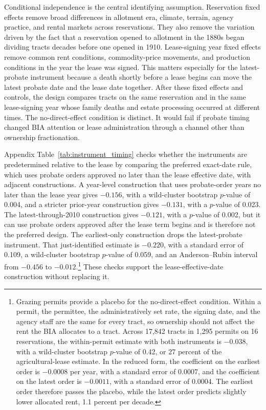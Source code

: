 \documentclass[12pt]{article}
\begin{document}
Conditional independence is the central identifying assumption. Reservation fixed effects remove broad differences in allotment era, climate, terrain, agency practice, and rental markets across reservations. They also remove the variation driven by the fact that a reservation opened to allotment in the 1880s began dividing tracts decades before one opened in 1910. Lease-signing year fixed effects remove common rent conditions, commodity-price movements, and production conditions in the year the lease was signed. This matters especially for the latest-probate instrument because a death shortly before a lease begins can move the latest probate date and the lease date together. After these fixed effects and controls, the design compares tracts on the same reservation and in the same lease-signing year whose family deaths and estate processing occurred at different times. The no-direct-effect condition is distinct. It would fail if probate timing changed BIA attention or lease administration through a channel other than ownership fractionation.

Appendix Table~\ref{tab:instrument_timing} checks whether the instruments are predetermined relative to the lease by comparing the preferred exact-date rule, which uses probate orders approved no later than the lease effective date, with adjacent constructions. A year-level construction that uses probate-order years no later than the lease year gives $-0.156$, with a wild-cluster bootstrap $p$-value of 0.004, and a stricter prior-year construction gives $-0.131$, with a $p$-value of 0.023. The latest-through-2010 construction gives $-0.121$, with a $p$-value of 0.002, but it can use probate orders approved after the lease term begins and is therefore not the preferred design. The earliest-only construction drops the latest-probate instrument. That just-identified estimate is $-0.220$, with a standard error of 0.109, a wild-cluster bootstrap $p$-value of 0.059, and an Anderson--Rubin interval from $-0.456$ to $-0.012$.\footnote{Grazing permits provide a placebo for the no-direct-effect condition. Within a permit, the permittee, the administratively set rate, the signing date, and the agency staff are the same for every tract, so ownership should not affect the rent the BIA allocates to a tract. Across 17,842 tracts in 1,295 permits on 16 reservations, the within-permit estimate with both instruments is $-0.038$, with a wild-cluster bootstrap $p$-value of 0.42, or 27 percent of the agricultural-lease estimate. In the reduced form, the coefficient on the earliest order is $-0.0008$ per year, with a standard error of 0.0007, and the coefficient on the latest order is $-0.0011$, with a standard error of 0.0004. The earliest order therefore passes the placebo, while the latest order predicts slightly lower allocated rent, 1.1 percent per decade.} These checks support the lease-effective-date construction without replacing it.
\end{document}
